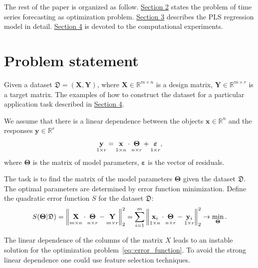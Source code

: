 \documentclass[runningheads]{llncs}
\newcommand{\bx}{\mathbf{x}}
\newcommand{\by}{\mathbf{y}}
\newcommand{\bY}{\mathbf{Y}}
\newcommand{\bX}{\mathbf{X}}
\newcommand{\bTheta}{\boldsymbol{\Theta}}
\begin{document}
The rest of the paper is organized as follow. \hyperref[sec:stat]{Section 2} states the problem of time series forecasting as optimization problem. \hyperref[sec:pls]{Section 3} describes the PLS regression model in detail. \hyperref[sec:exper]{Section 4} is devoted to the computational experiments.
 

\section{Problem statement}
\label{sec:stat}

Given a dataset $\mathfrak{D}= \left( \bX, \bY \right)$, where $\mathbf{X} \in \mathbb{R}^{m \times n}$ is a design matrix, $\mathbf{Y} \in \mathbb{R}^{m \times r}$ is a target matrix. 
The examples of how to construct the dataset for a particular application task described in \hyperref[sec:exper]{Section 4}.

We assume that there is a linear dependence between the objects $\bx \in \mathbb{R}^n$ and the responses $\by \in \mathbb{R}^r$
\begin{equation}
 \underset{1 \times r}{\by} = \underset{1 \times n}{\vphantom{\by}\bx} \cdot \underset{n \times r}{\vphantom{\by}\bTheta} + \underset{1 \times r}{\vphantom{\by}\boldsymbol{\varepsilon}}, 
\label{eq::model}
\end{equation}
where $\bTheta$ is the matrix of model parameters, $\boldsymbol{\varepsilon}$ is the vector of residuals.

The task is to find the matrix of the model parameters $\bTheta$ given the dataset $\mathfrak{D}$.
The optimal parameters are determined by error function minimization. 
Define the quadratic error function $S$ for the dataset $\mathfrak{D}$:
\begin{equation}
	S(\bTheta | \mathfrak{D}) = {\left\| \underset{m \times n}{\vphantom{\by}\mathbf{X}} \cdot \underset{n \times r}{\vphantom{\by}\bTheta} - \underset{m \times r}{\vphantom{\by}\mathbf{Y}} \right\| }_2^2 = \sum_{i=1}^m \left\| \underset{1 \times n}{\vphantom{\by}\bx_i} \cdot \underset{n \times r}{\vphantom{\by}\bTheta} - \underset{1 \times r}{\vphantom{\by}\by_i} \right\|_2^2 \rightarrow\min_{\bTheta}.
\label{eq::error_function}
\end{equation}
 
 The linear dependence of the columns of the matrix $X$ leads to an instable solution for the optimization problem~\eqref{eq::error_function}. 
 To avoid the strong linear dependence one could use feature selection techniques.
\end{document}
